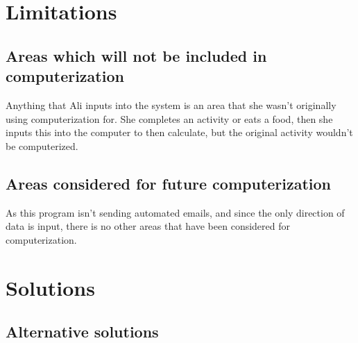 
\section{Limitations}

\subsection{Areas which will not be included in computerization}
Anything that Ali inputs into the system is an area that she wasn't originally using computerization for. She completes an activity or eats a food, then she inputs this into the computer to then calculate, but the original activity wouldn't be computerized.

\subsection{Areas considered for future computerization}
As this program isn't sending automated emails, and since the only direction of data is input, there is no other areas that have been considered for computerization.


\section{Solutions}

\subsection{Alternative solutions}

